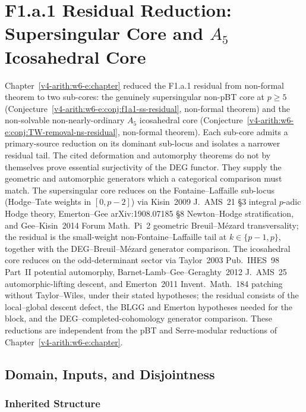 \chapter[Supersingular and Icosahedral Comparison]{F1.a.1 Residual Reduction: Supersingular Core and \(A_{5}\) Icosahedral Core}
\label{v4-arith:w10-f:chapter}

Chapter~\ref{v4-arith:w6-e:chapter} reduced the F1.a.1 residual from
non-formal theorem to two sub-cores: the genuinely supersingular non-pBT
core at \(p\geq 5\) (Conjecture~\ref{v4-arith:w6-e:conj:f1a1-ss-residual},
non-formal theorem) and the non-solvable non-nearly-ordinary \(A_{5}\)
icosahedral core
(Conjecture~\ref{v4-arith:w6-e:conj:TW-removal-ns-residual}, non-formal theorem).
Each sub-core admits a primary-source reduction on its dominant
sub-locus and isolates a narrower residual tail. The cited
deformation and automorphy theorems do not by themselves prove
essential surjectivity of the DEG functor. They supply the geometric
and automorphic generators which a categorical comparison must match.
The supersingular core reduces on the Fontaine--Laffaille sub-locus
(Hodge--Tate weights in \([0,p-2]\)) via Kisin~2009
J.~AMS~21 \S 3 integral \(p\)-adic Hodge theory, Emerton--Gee
arXiv:1908.07185 \S 8 Newton--Hodge stratification, and Gee--Kisin~2014
Forum Math.~Pi~2 geometric Breuil--M\'ezard transversality; the
residual is the small-weight non-Fontaine--Laffaille tail at
\(k\in\{p-1,p\}\), together with the DEG--Breuil--M\'ezard generator
comparison. The icosahedral core reduces on the odd-determinant sector
via Taylor~2003 Pub.~IHES~98 Part~II
potential automorphy, Barnet-Lamb--Gee--Geraghty~2012 J.~AMS~25
automorphic-lifting descent, and Emerton~2011 Invent.~Math.~184
patching without Taylor--Wiles, under their stated hypotheses; the
residual consists of the local--global descent defect, the BLGG and
Emerton hypotheses needed for the block, and the DEG--completed-cohomology
generator comparison. These reductions are independent from the pBT and
Serre-modular reductions of Chapter~\ref{v4-arith:w6-e:chapter}.

\section{Domain, Inputs, and Disjointness}
\label{v4-arith:w10-f:domain}

\subsection{Inherited Structure}
\label{v4-arith:w10-f:inherited}

